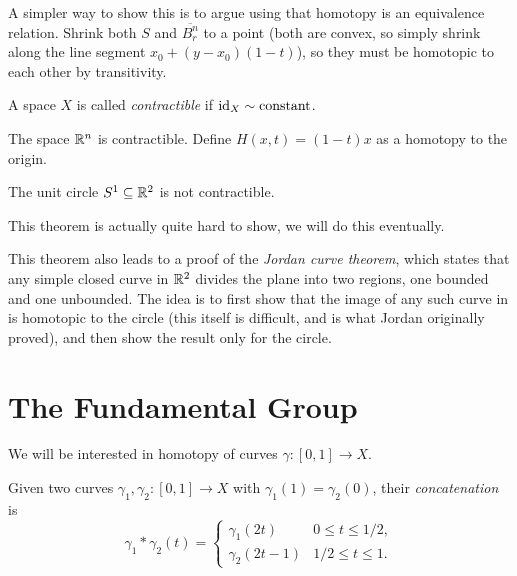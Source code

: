 \begin{remark}
  A simpler way to show this is to argue using that
  homotopy is an equivalence relation. Shrink both
  $S$ and $\overline{B_r^n}$ to a point (both
  are convex, so simply shrink along the line segment
  $x_0 + (y - x_0)(1 - t)$), so they must be
  homotopic to each other by transitivity.
\end{remark}

\begin{definition}
  A space $X$ is called \emph{contractible} if
  $\operatorname{id}_X \sim \text{constant}$.
\end{definition}

\begin{example}
  The space $\mathbb{R}^n$ is contractible. Define
  $H(x, t) = (1 - t) x$ as a homotopy to the origin.
\end{example}

\begin{theorem}
  The unit circle $S^1 \subseteq \mathbb{R}^2$ is not
  contractible.
\end{theorem}

\begin{remark}
  This theorem
  is actually quite hard to show, we will do
  this eventually.
\end{remark}

\begin{remark}
  This theorem also leads to a
  proof of the \emph{Jordan curve theorem}, which
  states that any simple closed curve in $\mathbb{R}^2$
  divides the plane into two regions, one bounded
  and one unbounded. The idea is to first
  show that the
  image of any such curve in is
  homotopic to the circle (this itself is
  difficult, and is what Jordan originally proved),
  and then show the result only for the circle.
\end{remark}

\section{The Fundamental Group}
\begin{remark}
  We will be interested in homotopy of curves
  $\gamma : [0, 1] \to X$.
\end{remark}

\begin{definition}
  Given two curves $\gamma_1, \gamma_2 : [0, 1] \to X$
  with $\gamma_1(1) = \gamma_2(0)$, their
  \emph{concatenation} is
  \[
  \gamma_1 * \gamma_2(t) = \begin{cases}
    \gamma_1(2t) & 0 \le t \le 1/2, \\
    \gamma_2(2t - 1) & 1/2 \le t \le 1.
  \end{cases}
  \]
\end{definition}


